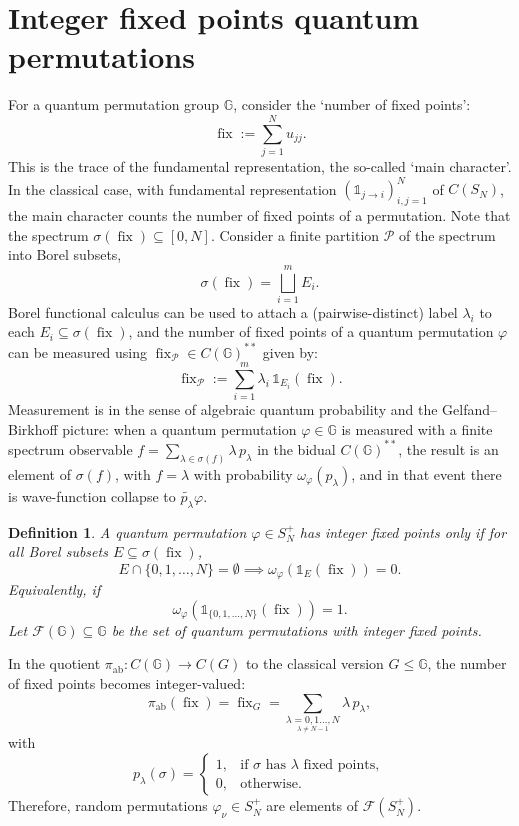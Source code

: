 \documentclass[12pt]{amsart}
\newtheorem{definition}[theorem]{Definition}
\theoremstyle{remark}
\theoremstyle{remark}
\begin{document}
\section{Integer fixed points quantum permutations}
For a quantum permutation group $\mathbb{G}$,  consider the `number of fixed points':
$$\operatorname{fix}:=\sum_{j=1}^N u_{jj}.$$
This is the trace of the fundamental representation, the so-called `main character'. In the classical case, with fundamental representation $(\mathds{1}_{j\to i})_{i,j=1}^N$ of $C(S_N)$, the  main character counts the number of fixed points of a permutation.
Note that the spectrum $\sigma(\operatorname{fix})\subseteq [0,N]$. Consider a finite partition $\mathcal{P}$ of the spectrum into Borel subsets,
$$\sigma(\operatorname{fix})=\bigsqcup_{i=1}^m E_i.$$
Borel functional calculus can be used to attach a (pairwise-distinct) label $\lambda_i$ to each $E_i\subseteq\sigma(\operatorname{fix})$, and the number of fixed points of a quantum permutation $\varphi$ can be measured using $\operatorname{fix}_{\mathcal{P}}\in C(\mathbb{G})^{**}$ given by:
$$\operatorname{fix}_{\mathcal{P}}:=\sum_{i=1}^m \lambda_i\,\mathds{1}_{E_i}(\operatorname{fix}).$$
Measurement  is in the sense of algebraic quantum probability and the Gelfand--Birkhoff picture: when a quantum permutation $\varphi\in \mathbb{G}$ is measured with a finite spectrum observable $f=\sum_{\lambda \in \sigma(f)}\lambda \, p_\lambda$ in the bidual $C(\mathbb{G})^{**}$, the result is an element of $\sigma(f)$, with $f=\lambda$ with probability $\omega_{\varphi}(p_\lambda)$, and in that event there is wave-function collapse to $\widetilde{p_\lambda}\varphi$.
\begin{definition}
A quantum permutation $\varphi\in S_N^+$ has \emph{integer fixed points only} if for all Borel subsets $E\subseteq \sigma(\operatorname{fix})$,
$$E\cap \{0,1,\dots,N\}=\emptyset \implies \omega_{\varphi}(\mathds{1}_{E}(\operatorname{fix}))=0.$$
Equivalently, if
$$\omega_{\varphi}(\mathds{1}_{\{0,1,\dots,N\}}(\operatorname{fix}))=1.$$
Let $\mathcal{F}(\mathbb{G})\subseteq\mathbb{G}$ be the set of quantum permutations with integer fixed points.
\end{definition}

In the quotient $\pi_{\text{ab}}:C(\mathbb{G})\to C(G)$ to the classical version $G\leq \mathbb{G}$, the number of fixed points becomes  integer-valued:
$$\pi_{\text{ab}}(\operatorname{fix})=\operatorname{fix}_{G}=\sum_{\underset{\lambda\neq N-1}{\lambda=0,1\dots,N}}\lambda \,p_{\lambda},$$
with
$$p_{\lambda}(\sigma)=\begin{cases}
                        1, & \mbox{if $\sigma$ has $\lambda$ fixed points},  \\
                        0, & \mbox{otherwise}.
                      \end{cases}$$
Therefore, random permutations $\varphi_\nu\in S_N^+$ are elements of $\mathcal{F}(S_N^+)$.
\end{document}
